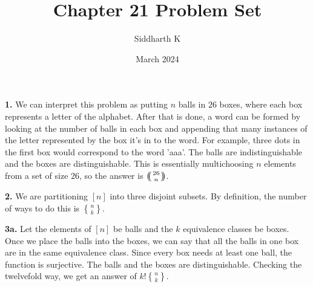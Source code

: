 \documentclass{article}
\title{Chapter 21 Problem Set}
\author{Siddharth K}
\date{March 2024}
\def\multiset#1#2{\ensuremath{\left(\kern-.3em\left(\genfrac{}{}{0pt}{}{#1}{#2}\right)\kern-.3em\right)}}
\begin{document}
\maketitle

\textbf{1.} We can interpret this problem as putting $n$ balls in $26$ boxes, where each box represents a letter of the alphabet. After that is done, a word can be formed by looking at the number of balls in each box and appending that many instances of the letter represented by the box it's in to the word. For example, three dots in the first box would correspond to the word 'aaa'. The balls are indistinguishable and the boxes are distinguishable. This is essentially multichoosing $n$ elements from a set of size $26$, so the answer is $\multiset{26}{n}$.
\newline

\textbf{2.} We are partitioning $[n]$ into three disjoint subsets. By definition, the number of ways to do this is ${n\brace k}$.
\newline

\textbf{3a.} Let the elements of $[n]$ be balls and the $k$ equivalence classes be boxes. Once we place the balls into the boxes, we can say that all the balls in one box are in the same equivalence class. Since every box needs at least one ball, the function is surjective. The balls and the boxes are distinguishable. Checking the twelvefold way, we get an answer of $k!{n\brace k}$.
\newline
\end{document}
